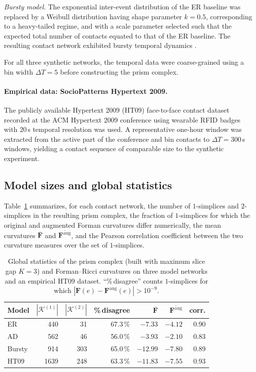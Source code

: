 \documentclass[
    pre,
    twocolumn,
    superscriptaddress,
    showpacs,
    nofootinbib,
    amsmath,
    amssymb,
    floatfix
]{revtex4-2}
\newcommand{\K}{\mathcal{K}}
\newcommand{\F}{\mathbf{F}}        %
\newcommand{\Faug}{\F^{\mathrm{aug}}}
\theoremstyle{plain} %
\theoremstyle{definition} %
\begin{document}
\textit{Bursty model.}
The exponential inter-event distribution of the ER baseline was replaced by a Weibull distribution having shape parameter $k=0.5$, corresponding to a heavy-tailed regime, and with a scale parameter selected such that the expected total number of contacts equated to that of the ER baseline.
The resulting contact network exhibited bursty temporal dynamics \cite{Karsai2011}.

For all three synthetic networks, the temporal data were coarse-grained using a bin width $\Delta T = 5$ before constructing the prism complex.

\paragraph{Empirical data: SocioPatterns Hypertext 2009.}
The publicly available Hypertext 2009 (HT09) face-to-face contact dataset~\cite{Cattuto2010,Isella2011} recorded at the ACM Hypertext 2009 conference using wearable RFID badges with $20\,$s temporal resolution was used.
A representative one-hour window was extracted from the active part of the conference and bin contacts to $\Delta T=300\,$s windows, yielding a contact sequence of comparable size to the synthetic experiment.

\subsection{Model sizes and global statistics}\label{ssec:results_global}
Table~\ref{tab:results_summary} summarizes, for each contact network, the number of $1$-simplices and $2$-simplices in the resulting prism complex, the fraction of $1$-simplices for which the original and augmented Forman curvatures differ numerically, the mean curvatures $\overline{\F}$ and $\overline{\Faug}$, and the Pearson correlation coefficient between the two curvature measures over the set of $1$-simplices.
\begin{table}[H]
\caption{Global statistics of the prism complex (built with maximum slice gap $K=3$) and Forman--Ricci curvatures on three model networks and an empirical HT09 dataset.
``\%\,disagree'' counts $1$-simplices for which $|\F(e)-\Faug(e)|>10^{-9}$.}
\label{tab:results_summary}
\begin{ruledtabular}
\begin{tabular}{lrrrrrr}
Model & $|\K^{(1)}|$ & $|\K^{(2)}|$ & \%\,disagree
      & $\overline{\F}$ & $\overline{\Faug}$ & corr.\\
\hline
ER     &  440 &  31 & 67.3\,\% & $-7.33$  & $-4.12$ & 0.90\\
AD     &  562 &  46 & 56.0\,\% & $-3.93$  & $-2.10$ & 0.83\\
Bursty &  914 & 303 & 65.0\,\% & $-12.99$ & $-7.80$ & 0.89\\
HT09   & 1639 & 248 & 63.3\,\% & $-11.83$ & $-7.55$ & 0.93\\
\end{tabular}
\end{ruledtabular}
\end{table}
\end{document}
